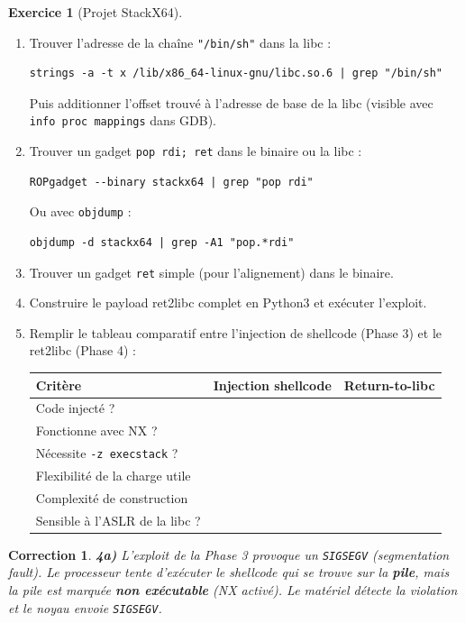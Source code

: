 \documentclass[a4paper,11pt]{article}
\theoremstyle{plain}
\newtheorem{correction}{Correction}
\theoremstyle{definition}
\newtheorem{exercice}{Exercice}
\begin{document}
\begin{exercice}[Projet StackX64]
\begin{enumerate}
\item[\textbf{4c)}] Trouver l'adresse de la chaîne \texttt{"/bin/sh"} dans la libc :
\begin{lstlisting}[style=GDBStyle]
strings -a -t x /lib/x86_64-linux-gnu/libc.so.6 | grep "/bin/sh"
\end{lstlisting}
Puis additionner l'offset trouvé à l'adresse de base de la libc (visible avec \texttt{info proc mappings} dans GDB).

\item[\textbf{4d)}] Trouver un gadget \texttt{pop rdi; ret} dans le binaire ou la libc :
\begin{lstlisting}[style=GDBStyle]
ROPgadget --binary stackx64 | grep "pop rdi"
\end{lstlisting}
Ou avec \texttt{objdump} :
\begin{lstlisting}[style=GDBStyle]
objdump -d stackx64 | grep -A1 "pop.*rdi"
\end{lstlisting}

\item[\textbf{4e)}] Trouver un gadget \texttt{ret} simple (pour l'alignement) dans le binaire.

\item[\textbf{4f)}] Construire le payload ret2libc complet en Python3 et exécuter l'exploit.

\item[\textbf{4g)}] Remplir le tableau comparatif entre l'injection de shellcode (Phase 3) et le ret2libc (Phase 4) :
\begin{center}
\begin{tabular}{lcc}
\toprule
\textbf{Critère} & \textbf{Injection shellcode} & \textbf{Return-to-libc} \\
\midrule
Code injecté ? & & \\
Fonctionne avec NX ? & & \\
Nécessite \texttt{-z execstack} ? & & \\
Flexibilité de la charge utile & & \\
Complexité de construction & & \\
Sensible à l'ASLR de la libc ? & & \\
\bottomrule
\end{tabular}
\end{center}
\end{enumerate}

\begin{correction}

\textbf{4a)} L'exploit de la Phase 3 provoque un \texttt{SIGSEGV} (segmentation fault). Le processeur tente d'exécuter le shellcode qui se trouve sur la \textbf{pile}, mais la pile est marquée \textbf{non exécutable} (NX activé). Le matériel détecte la violation et le noyau envoie \texttt{SIGSEGV}.


\end{correction}
\end{exercice}
\end{document}
